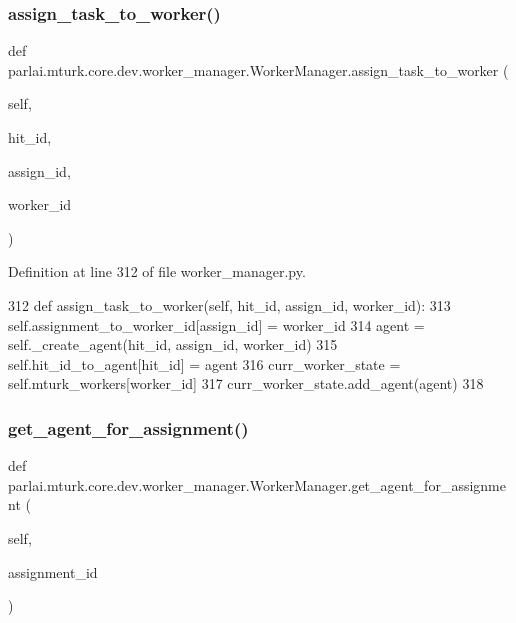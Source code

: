 \subsubsection{\texorpdfstring{assign\+\_\+task\+\_\+to\+\_\+worker()}{assign\_task\_to\_worker()}}
{\footnotesize\ttfamily def parlai.\+mturk.\+core.\+dev.\+worker\+\_\+manager.\+Worker\+Manager.\+assign\+\_\+task\+\_\+to\+\_\+worker (\begin{DoxyParamCaption}\item[{}]{self,  }\item[{}]{hit\+\_\+id,  }\item[{}]{assign\+\_\+id,  }\item[{}]{worker\+\_\+id }\end{DoxyParamCaption})}



Definition at line 312 of file worker\+\_\+manager.\+py.


\begin{DoxyCode}
312     \textcolor{keyword}{def }assign\_task\_to\_worker(self, hit\_id, assign\_id, worker\_id):
313         self.assignment\_to\_worker\_id[assign\_id] = worker\_id
314         agent = self.\_create\_agent(hit\_id, assign\_id, worker\_id)
315         self.hit\_id\_to\_agent[hit\_id] = agent
316         curr\_worker\_state = self.mturk\_workers[worker\_id]
317         curr\_worker\_state.add\_agent(agent)
318 
\end{DoxyCode}
\mbox{\label{classparlai_1_1mturk_1_1core_1_1dev_1_1worker__manager_1_1WorkerManager_a91cd8f81f6165b8cea229396c185a75d}} 
\subsubsection{\texorpdfstring{get\+\_\+agent\+\_\+for\+\_\+assignment()}{get\_agent\_for\_assignment()}}
{\footnotesize\ttfamily def parlai.\+mturk.\+core.\+dev.\+worker\+\_\+manager.\+Worker\+Manager.\+get\+\_\+agent\+\_\+for\+\_\+assignment (\begin{DoxyParamCaption}\item[{}]{self,  }\item[{}]{assignment\+\_\+id }\end{DoxyParamCaption})}


